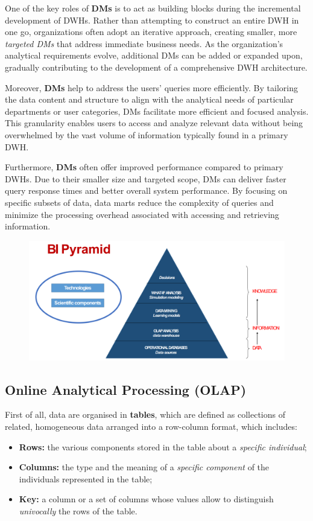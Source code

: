 One of the key roles of \textbf{DMs} is to act as building blocks during the incremental development of DWHs. Rather than attempting to construct an entire DWH in one go, organizations often adopt an iterative approach, creating smaller, more \textit{targeted DMs} that address immediate business needs. As the organization's analytical requirements evolve, additional DMs can be added or expanded upon, gradually contributing to the development of a comprehensive DWH architecture.

Moreover, \textbf{DMs} help to address the users' queries more efficiently. By tailoring the data content and structure to align with the analytical needs of particular departments or user categories, DMs facilitate more efficient and focused analysis. This granularity enables users to access and analyze relevant data without being overwhelmed by the vast volume of information typically found in a primary DWH.

Furthermore, \textbf{DMs} often offer improved performance compared to primary DWHs. Due to their smaller size and targeted scope, DMs can deliver faster query response times and better overall system performance. By focusing on specific subsets of data, data marts reduce the complexity of queries and minimize the processing overhead associated with accessing and retrieving information.

\begin{figure}[ht!]
    \centering
    \includegraphics[scale=0.39]{images/BI_pyramid.png}
\end{figure}

\subsection{Online Analytical Processing (OLAP)}

First of all, data are organised in \textbf{tables}, which are defined as collections of related, homogeneous data arranged into a row-column format, which includes:
\begin{itemize}
    \item \textbf{Rows:} the various components stored in the table about a \textit{specific individual};
    \item \textbf{Columns:} the type and the meaning of a \textit{specific component} of the individuals represented in the table;
    \item \textbf{Key:} a column or a set of columns whose values allow to distinguish \textit{univocally} the rows of the table.
\end{itemize}

